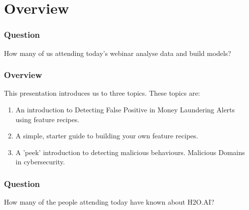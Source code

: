 \documentclass[11pt,
               aspectratio=169,
               hyperref={colorlinks}
               ]{beamer}
\begin{document}
\section{Overview}
	\begin{frame}
		\frametitle{Question}
		How many of us attending today's webinar analyse data and build models?
	\end{frame}

	\begin{frame}
		\frametitle{Overview}

		This presentation introduces us to three topics. These topics are:
		\begin{enumerate}
			\item An introduction to Detecting False Positive in Money Laundering Alerts using feature recipes. 
			\item A simple, starter guide to building your own feature recipes. 
			\item A 'peek' introduction to detecting malicious behaviours. Malicious Domains in cybersecurity.
		\end{enumerate}
	\end{frame}

	\begin{frame}
		\frametitle{Question} 
		How many of the people attending today have known about H2O.AI?
	\end{frame}
\end{document}
